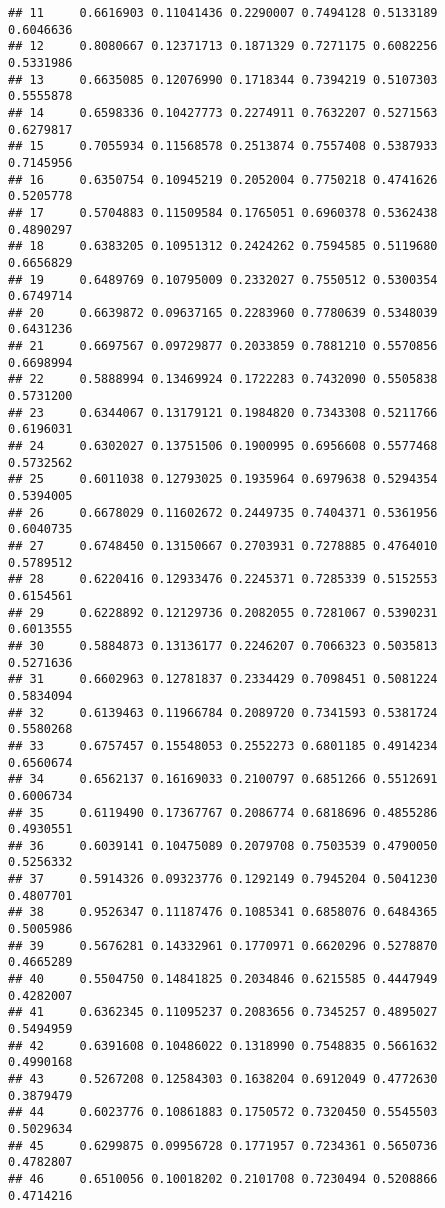 \documentclass[]{article}
\begin{document}
\begin{verbatim}
## 11     0.6616903 0.11041436 0.2290007 0.7494128 0.5133189    0.6046636
## 12     0.8080667 0.12371713 0.1871329 0.7271175 0.6082256    0.5331986
## 13     0.6635085 0.12076990 0.1718344 0.7394219 0.5107303    0.5555878
## 14     0.6598336 0.10427773 0.2274911 0.7632207 0.5271563    0.6279817
## 15     0.7055934 0.11568578 0.2513874 0.7557408 0.5387933    0.7145956
## 16     0.6350754 0.10945219 0.2052004 0.7750218 0.4741626    0.5205778
## 17     0.5704883 0.11509584 0.1765051 0.6960378 0.5362438    0.4890297
## 18     0.6383205 0.10951312 0.2424262 0.7594585 0.5119680    0.6656829
## 19     0.6489769 0.10795009 0.2332027 0.7550512 0.5300354    0.6749714
## 20     0.6639872 0.09637165 0.2283960 0.7780639 0.5348039    0.6431236
## 21     0.6697567 0.09729877 0.2033859 0.7881210 0.5570856    0.6698994
## 22     0.5888994 0.13469924 0.1722283 0.7432090 0.5505838    0.5731200
## 23     0.6344067 0.13179121 0.1984820 0.7343308 0.5211766    0.6196031
## 24     0.6302027 0.13751506 0.1900995 0.6956608 0.5577468    0.5732562
## 25     0.6011038 0.12793025 0.1935964 0.6979638 0.5294354    0.5394005
## 26     0.6678029 0.11602672 0.2449735 0.7404371 0.5361956    0.6040735
## 27     0.6748450 0.13150667 0.2703931 0.7278885 0.4764010    0.5789512
## 28     0.6220416 0.12933476 0.2245371 0.7285339 0.5152553    0.6154561
## 29     0.6228892 0.12129736 0.2082055 0.7281067 0.5390231    0.6013555
## 30     0.5884873 0.13136177 0.2246207 0.7066323 0.5035813    0.5271636
## 31     0.6602963 0.12781837 0.2334429 0.7098451 0.5081224    0.5834094
## 32     0.6139463 0.11966784 0.2089720 0.7341593 0.5381724    0.5580268
## 33     0.6757457 0.15548053 0.2552273 0.6801185 0.4914234    0.6560674
## 34     0.6562137 0.16169033 0.2100797 0.6851266 0.5512691    0.6006734
## 35     0.6119490 0.17367767 0.2086774 0.6818696 0.4855286    0.4930551
## 36     0.6039141 0.10475089 0.2079708 0.7503539 0.4790050    0.5256332
## 37     0.5914326 0.09323776 0.1292149 0.7945204 0.5041230    0.4807701
## 38     0.9526347 0.11187476 0.1085341 0.6858076 0.6484365    0.5005986
## 39     0.5676281 0.14332961 0.1770971 0.6620296 0.5278870    0.4665289
## 40     0.5504750 0.14841825 0.2034846 0.6215585 0.4447949    0.4282007
## 41     0.6362345 0.11095237 0.2083656 0.7345257 0.4895027    0.5494959
## 42     0.6391608 0.10486022 0.1318990 0.7548835 0.5661632    0.4990168
## 43     0.5267208 0.12584303 0.1638204 0.6912049 0.4772630    0.3879479
## 44     0.6023776 0.10861883 0.1750572 0.7320450 0.5545503    0.5029634
## 45     0.6299875 0.09956728 0.1771957 0.7234361 0.5650736    0.4782807
## 46     0.6510056 0.10018202 0.2101708 0.7230494 0.5208866    0.4714216

\end{verbatim}
\end{document}
